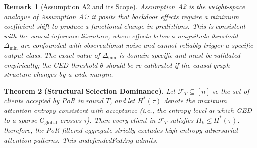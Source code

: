 \documentclass[journal]{IEEEtran}
\newtheorem{remark}{Remark}
\begin{document}
\begin{remark}[Assumption A2 and its Scope]
Assumption A2 is the weight-space analogue of Assumption A1: it posits that backdoor effects require a minimum coefficient shift to produce a functional change in predictions. This is consistent with the causal inference literature, where effects below a magnitude threshold $\Delta_{\min}$ are confounded with observational noise and cannot reliably trigger a specific output class. The exact value of $\Delta_{\min}$ is domain-specific and must be validated empirically; the CED threshold $\theta$ should be re-calibrated if the causal graph structure changes by a wide margin. \end{remark}

\textbf{Theorem 2 (Structural Selection Dominance).} \emph{Let $\mathcal{F}_T \subseteq [n]$ be the set of clients accepted by PoR in round $T$, and let $H^*(\tau)$ denote the maximum attention entropy consistent with acceptance (i.e., the entropy level at which GED to a sparse $G_\text{global}$ crosses $\tau$). Then every client in $\mathcal{F}_T$ satisfies $H_k \le H^*(\tau)$.  therefore, the PoR-filtered aggregate strictly excludes high-entropy adversarial attention patterns. This undefendedFedAvg admits.}
\end{document}
